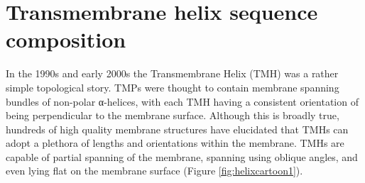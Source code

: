 \documentclass[12pt,PhD,twoside]{muthesis}
\begin{document}
\section{Transmembrane helix sequence composition}


In the 1990s and early 2000s the Transmembrane Helix (TMH) was a rather simple topological story. TMPs were thought to contain membrane spanning bundles of non-polar α-helices, with each TMH having a consistent orientation of being perpendicular to the membrane surface. Although this is broadly true, hundreds of high quality membrane structures have elucidated that TMHs can adopt a plethora of lengths and orientations within the membrane. TMHs are capable of partial spanning of the membrane, spanning using oblique angles, and even lying flat on the membrane surface \cite{VonHeijne2006, Elofsson2007} (Figure \ref{fig:helixcartoon1}).
\end{document}
